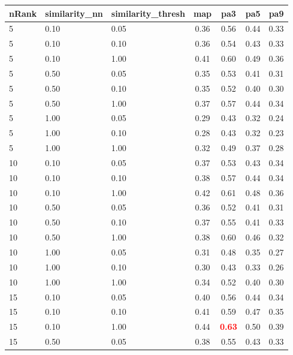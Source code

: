 \documentclass[12pt,a4paper,fleqn]{tufte-handout}
\begin{document}
 
\begin{table}            
\begin{center}            
\scriptsize            
\setlength{\tabcolsep}{.16667em}            
\begin{tabular}{lllcccc}            
nRank & similarity\_nn & similarity\_thresh & map & pa3 & pa5 & pa9 \\            
\hline            
5 & 0.10 & 0.05 & 0.36 & 0.56 & 0.44 & 0.33 \\            
5 & 0.10 & 0.10 & 0.36 & 0.54 & 0.43 & 0.33 \\            
5 & 0.10 & 1.00 & 0.41 & 0.60 & 0.49 & 0.36 \\            
5 & 0.50 & 0.05 & 0.35 & 0.53 & 0.41 & 0.31 \\            
5 & 0.50 & 0.10 & 0.35 & 0.52 & 0.40 & 0.30 \\            
5 & 0.50 & 1.00 & 0.37 & 0.57 & 0.44 & 0.34 \\            
5 & 1.00 & 0.05 & 0.29 & 0.43 & 0.32 & 0.24 \\            
5 & 1.00 & 0.10 & 0.28 & 0.43 & 0.32 & 0.23 \\            
5 & 1.00 & 1.00 & 0.32 & 0.49 & 0.37 & 0.28 \\            
10 & 0.10 & 0.05 & 0.37 & 0.53 & 0.43 & 0.34 \\            
10 & 0.10 & 0.10 & 0.38 & 0.57 & 0.44 & 0.34 \\            
10 & 0.10 & 1.00 & 0.42 & 0.61 & 0.48 & 0.36 \\            
10 & 0.50 & 0.05 & 0.36 & 0.52 & 0.41 & 0.31 \\            
10 & 0.50 & 0.10 & 0.37 & 0.55 & 0.41 & 0.33 \\            
10 & 0.50 & 1.00 & 0.38 & 0.60 & 0.46 & 0.32 \\            
10 & 1.00 & 0.05 & 0.31 & 0.48 & 0.35 & 0.27 \\            
10 & 1.00 & 0.10 & 0.30 & 0.43 & 0.33 & 0.26 \\            
10 & 1.00 & 1.00 & 0.34 & 0.52 & 0.40 & 0.30 \\            
15 & 0.10 & 0.05 & 0.40 & 0.56 & 0.44 & 0.34 \\            
15 & 0.10 & 0.10 & 0.41 & 0.59 & 0.47 & 0.35 \\            
15 & 0.10 & 1.00 & 0.44 & \textbf{\textcolor{red}{0.63}} & 0.50 & 0.39 \\            
15 & 0.50 & 0.05 & 0.38 & 0.55 & 0.43 & 0.33 \\            

\end{tabular}
\end{center}
\end{table}
\end{document}
